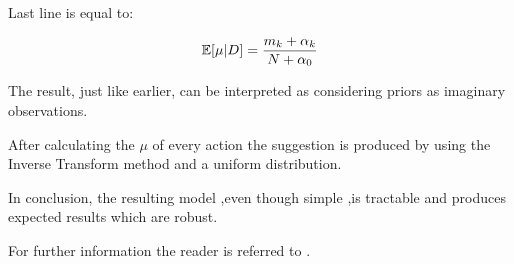 Last line is equal to:

\[\mathbb{E}[\mu|D]={m_k+\alpha_k \over {N+\alpha_0}} \]

The result, just like earlier, can be interpreted as considering priors as imaginary observations.

After calculating the $\mu$ of every action the suggestion is produced by using the Inverse Transform\cite{Devroye1986} method and a uniform distribution.

In conclusion, the resulting model ,even though simple ,is tractable and produces expected results which are robust.

For further information the reader is referred to \cite{Bishop2007}.
